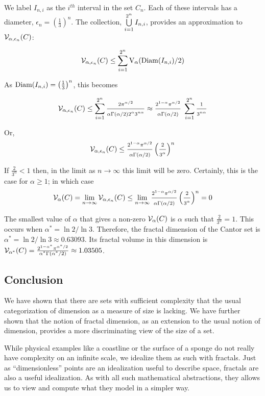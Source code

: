 {We label $I_{n,i}$ as the $i^{th}$ interval in the set
$C_n$. Each of these intervals has a diameter, $\epsilon_n = \left(\frac{1}{3}\right)^n$.
The collection, $\bigcup_{i=1}^{2^n}\limits I_{n,i}$, provides an
approximation to ${\cal V}_{\alpha, \epsilon_n}(C)$:


$$
{\cal V}_{\alpha, \epsilon_n}(C) \le \sum_{i=1}^{2^n} {\rm V}_\alpha({\rm
  Diam}(I_{n,i}) / 2)
$$

As ${\rm Diam}(I_{n,i}) = \left(\frac{1}{3}\right)^n$, this becomes


$$
{\cal V}_{\alpha, \epsilon_n}(C) \le \sum_{i=1}^{2^n} \frac{2
  \pi^{\alpha/2}}{ \alpha \Gamma(\alpha/2) 2^\alpha 3^{n\alpha}} 
  \approx  \frac{
  2^{1 - \alpha} \pi^{\alpha/2}}{\alpha \Gamma(\alpha/2)} \;
  \sum_{i=1}^{2^n}  
\frac{1}{3^{n\alpha}}
$$

Or, 
$$
{\cal V}_{\alpha, \epsilon_n}(C) \le \frac{ 2^{1-\alpha} \pi^{\alpha/2}}{\alpha
  \Gamma(\alpha/2)} \left(\frac{2}{3^\alpha}\right)^n
$$


If $\frac{2}{3^\alpha} < 1$ then, in the limit as 
$n \rightarrow \infty$ 
this limit will be zero. Certainly,
this is the case for $\alpha \ge 1$; in which case 
$$
{\cal V}_\alpha(C) =  \lim_{n \rightarrow \infty} {\cal V}_{\alpha, \epsilon_n}(C) \le \lim_{n \rightarrow \infty}  \frac{ 2^{1-\alpha} 
\pi^{\alpha/2}}{\alpha
  \Gamma(\alpha/2)} \left(\frac{2}{3^\alpha}\right)^n = 0 
$$

The smallest value of $\alpha$ that gives a non-zero ${\cal V}_\alpha(C)$ 
is $\alpha$ such that $\frac{2}{3^\alpha} = 1$. 
This occurs when
$\alpha^* = \ln 2 / \ln 3$. Therefore, the fractal dimension of the
Cantor set is $\alpha^* = \ln 2 / \ln 3 \approx 0.63093$. 
Its fractal volume in this
dimension is ${\cal V}_{\alpha^*}(C) =  \frac{2^{1-\alpha^*} 
\pi^{\alpha^*/2}}{\alpha^*
\Gamma(\alpha^* / 2)} \approx 1.03505 $.

\subsection{Conclusion}
We have shown that there are sets with sufficient complexity that the
usual categorization of dimension as a measure of size is lacking. 
We have further shown
that the notion of fractal dimension, as an extension to the usual
notion of dimension, provides a more discriminating view of the size
of a set.

While physical examples like a coastline or the surface of a sponge do 
not really have
complexity on an infinite scale, we idealize them as such with
fractals. Just as ``dimensionless'' points are an idealization useful
to describe space, fractals are also a useful idealization. 
As with all such mathematical abstractions, they 
allows us to view and compute what they model in a simpler way.

}
